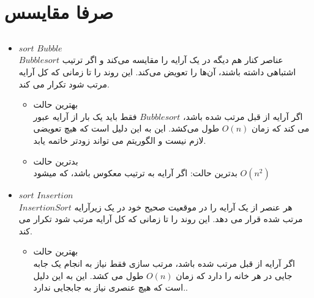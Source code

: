 \documentclass[12pt]{article}
\begin{document}
\fontsize{12pt}{14pt}\selectfont




\section{صرفا مقایسس}
\subsection{}
\begin{itemize}
    \item $sort$ $Bubble$
    \\
            $Bubble sort$ عناصر کنار هم دیگه در یک آرایه را مقایسه می‌کند و اگر ترتیب اشتباهی داشته باشند، آن‌ها را تعویض می‌کند. این روند را تا زمانی که کل آرایه مرتب شود تکرار می کند.
            
            \begin{itemize}
                \item بهترین حالت
                \\
                اگر آرایه از قبل مرتب شده باشد، $Bubble sort$ فقط باید یک بار از آرایه عبور می کند که زمان $O(n)$ طول می‌کشد. این به این دلیل است که هیچ تعویضی لازم نیست و الگوریتم می تواند زودتر خاتمه یابد.
            
                \item بدترین حالت
                \\
                بدترین حالت: اگر آرایه به ترتیب معکوس باشد، که میشود $O(n^2)$
            \end{itemize}
            
    \item $sort$ $Insertion$
            \\
            $Insertion Sort$ هر عنصر از یک آرایه را در موقعیت صحیح خود در یک زیرآرایه مرتب شده قرار می دهد. این روند را تا زمانی که کل آرایه مرتب شود تکرار می کند.
            \begin{itemize}
                \item بهترین حالت
                \\
                 اگر آرایه از قبل مرتب شده باشد، مرتب سازی فقط نیاز به انجام یک جابه جایی در هر خانه را دارد که زمان $O(n)$ طول می کشد. این به این دلیل است که هیچ عنصری نیاز به جابجایی ندارد..
            

\end{itemize}
\end{itemize}
\end{document}
